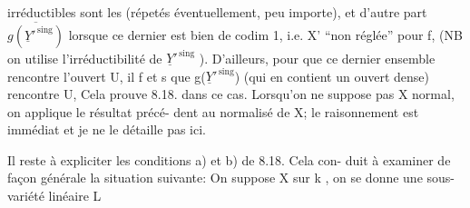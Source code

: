 irréductibles sont les    (répetés éventuellement, peu importe), et
d'autre part $\overline{g(\underline{Y}'^{\,\mathrm{sing}})}$  lorsque  ce dernier  est bien de codim 1, i.e.
X' ``non réglée'' pour f, (NB on utilise l'irréductibilité de  $\underline{Y}'^{\,\mathrm{sing}}$ ).
D'ailleurs, pour que ce dernier ensemble rencontre  l'ouvert U,
il f et s  que  g($\underline{Y}'^{\,\mathrm{sing}}$)  (qui en contient un ouvert dense) rencontre
U,  Cela prouve 8.18. dans ce
cas.  Lorsqu'on ne suppose pas X normal, on applique le résultat précé-%
dent au normalisé de X; le raisonnement est immédiat et je ne le détaille
pas ici.  

Il reste à expliciter  les conditions a) et b) de 8.18. Cela con-%
duit à examiner de façon générale la situation suivante:  On suppose
X  sur k , on se donne une sous-variété linéaire  L 


